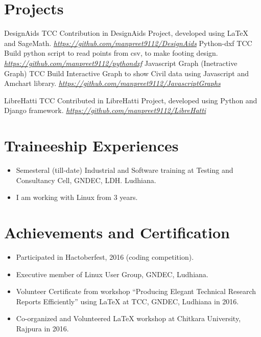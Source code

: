 \documentclass[]{friggeri-cv}
\begin{document}
\section{Projects}
\begin{entrylist}
   \entry
    {}
    {DesignAids}
    {TCC}
    {
       Contribution in DesignAids Project, developed using LaTeX and
SageMath.  
        \textit{\href{https://github.com/manpreet9112/DesignAids}{https://github.com/manpreet9112/DesignAids}}
    }
  \entry
    {}
    {Python-dxf}
    {TCC}
    {
      Build python script to read points from csv, to make footing
design.  
        \textit{\href{https://github.com/manpreet9112/pythondxf}{https://github.com/manpreet9112/pythondxf}}
    }
    \entry
    {}
    {Javascript Graph (Inetractive Graph)}
    {TCC}
    {
       Build Interactive Graph to show Civil data using Javascript and
Amchart library.
        \textit{\href{https://github.com/manpreet9112/JavascriptGraphs}{https://github.com/manpreet9112/JavascriptGraphs}}
    }

  \entry
    {}
    {LibreHatti}
    {TCC}
    {
       Contributed in LibreHatti Project, developed using Python and
Django framework.
        \textit{\href{https://github.com/manpreet9112/LibreHatti}{https://github.com/manpreet9112/LibreHatti}} 
    }
\end{entrylist}
\section{Traineeship Experiences}
\begin{itemize}
\item Semesteral (till-date) Industrial and Software training at Testing
and Consultancy Cell, GNDEC, LDH.
Ludhiana.
\item I am working with Linux from 3 years.
\end{itemize}
\section{Achievements and Certification}
\begin{itemize}
\item Participated in Hactoberfest, 2016 (coding competition).
\item Executive member of Linux User Group, GNDEC, Ludhiana.
\item Volunteer Certificate from workshop “Producing Elegant Technical
Research Reports Efficiently” using
LaTeX at TCC, GNDEC, Ludhiana in 2016.
\item Co-organized and Volunteered LaTeX workshop at Chitkara
University, Rajpura in 2016.
\end{itemize}
\end{document}
